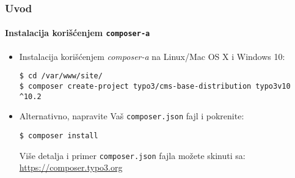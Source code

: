 
\begin{frame}[fragile]
	\frametitle{Uvod}
	\framesubtitle{Instalacija korišćenjem \texttt{composer-a}}

	\begin{itemize}
		\item Instalacija korišćenjem \textit{composer-a} na Linux/Mac OS X i Windows 10:
\begin{lstlisting}
$ cd /var/www/site/
$ composer create-project typo3/cms-base-distribution typo3v10 ^10.2
\end{lstlisting}

		\item Alternativno, napravite Vaš \texttt{composer.json} fajl i pokrenite:
\begin{lstlisting}
$ composer install
\end{lstlisting}

			Više detalja i primer \texttt{composer.json} fajla možete skinuti sa:
			\smaller
				\href{https://composer.typo3.org}{https://composer.typo3.org}
			\normalsize

	\end{itemize}
\end{frame}


